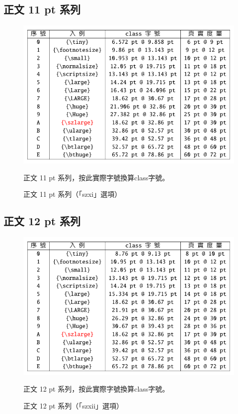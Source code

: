 \subsection{正文 11 pt 系列}
\begin{figure}[H]
\begin{center}
\caption{正文 11 pt 系列（「szxi」選項）}
{ \includegraphics[scale=1]{figures/sz11.pdf}}
\end{center}
\par 正文 11 pt 系列，按此實際字號換算class字號。
\end{figure}


\subsection{正文 12 pt 系列}
\begin{figure}[H]
\begin{center}
\caption{正文 12 pt 系列（「szxii」選項）}
{ \includegraphics[scale=1]{figures/sz12.pdf}}
\end{center}
\par 正文 12 pt 系列，按此實際字號換算class字號。
\end{figure}

